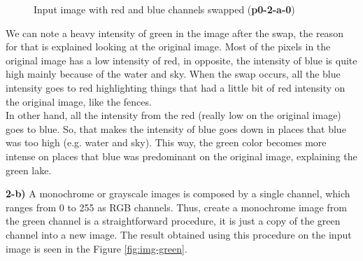 \documentclass[12pt,a4paper]{article}
\begin{document}
\begin{figure}[!h]
	\centering
	{%
		\setlength{\fboxsep}{1pt}%
		\setlength{\fboxrule}{1pt}%
	}%
	\caption{Input image with red and blue channels swapped (\textbf{p0-2-a-0})}
	\label{fig:p0-2-a-0}
\end{figure}

We can note a heavy intensity of green in the image after the swap, the reason for that is explained looking at the original image. Most of the pixels in the original image has a low intensity of red, in opposite, the intensity of blue is quite high mainly because of the water and sky. When the swap occurs, all the blue intensity goes to red highlighting things that had a little bit of red intensity on the original image, like the fences. \\

In other hand, all the intensity from the red (really low on the original image) goes to blue. So, that makes the intensity of blue goes down in places that blue was too high (e.g. water and sky). This way, the green color becomes more intense on places that blue was predominant on the original image, explaining the green lake.\\

\newpage

\textbf{2-b) } A monochrome or grayscale images is composed by a single channel, which ranges from 0 to 255 as RGB channels. Thus, create a monochrome image from the green channel is a straightforward procedure, it is just a copy of the green channel into a new image. The result obtained using this procedure on the input image is seen in the Figure \ref{fig:img-green}.
\end{document}
